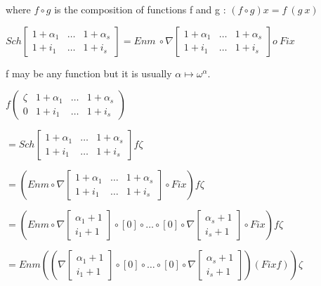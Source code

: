 \documentclass[10pt]{article}
\begin{document}
where \( f \circ g \) is the composition of functions f and g : \( (f \circ g) x = f\ (g\ x) \)

\( Sch \begin{bmatrix} 1+\alpha_1 & \ldots & 1+\alpha_s \\
                       1+i_1      & \ldots & 1+i_s      \end{bmatrix} 
= Enm\ \circ \nabla \begin{bmatrix} 1+\alpha_1 & \ldots & 1+\alpha_s \\
                                          1+i_1      & \ldots & 1+i_s      \end{bmatrix} o\ Fix
\)


f may be any function but it is usually \( \alpha \mapsto \omega^\alpha \).

\( f \begin{pmatrix} \zeta & 1+\alpha_1 & \ldots & 1+\alpha_s \\
                     0     & 1+i_1      & \ldots & 1+i_s      \end{pmatrix} \)

\( = Sch \begin{bmatrix} 1+\alpha_1 & \ldots & 1+\alpha_s \\
                      1+i_1      & \ldots & 1+i_s      \end{bmatrix} f \zeta \)

\( = (Enm \circ \nabla \begin{bmatrix} 1+\alpha_1 & \ldots & 1+\alpha_s \\
                                       1+i_1      & \ldots & 1+i_s      \end{bmatrix} \circ Fix) f \zeta \)

\( = (Enm \circ \nabla \begin{bmatrix} \alpha_1+1 \\
                                       i_1+1      \end{bmatrix} \circ [0] \circ \ldots \circ [0] \circ \nabla \begin{bmatrix} \alpha_s+1 \\
                                                                                                                              i_s+1      \end{bmatrix} \circ Fix) f \zeta \)

\( = Enm ((\nabla \begin{bmatrix} \alpha_1+1 \\
                                  i_1+1      \end{bmatrix} \circ [0] \circ \ldots \circ [0] \circ \nabla \begin{bmatrix} \alpha_s+1 \\
                                                                                                                         i_s+1      \end{bmatrix}) (Fix f)) \zeta \)
\end{document}
